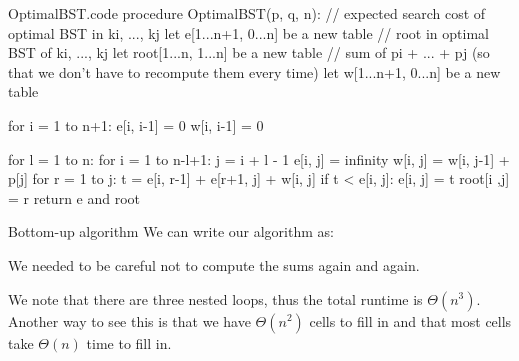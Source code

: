 \documentclass[a4paper]{article}
\begin{document}
\begin{filecontents*}[overwrite]{OptimalBST.code}
procedure OptimalBST(p, q, n):
    // expected search cost of optimal BST in ki, ..., kj
    let e[1...n+1, 0...n] be a new table
    // root in optimal BST of ki, ..., kj
    let root[1...n, 1...n] be a new table
    // sum of pi + ... + pj (so that we don't have to recompute them every time)
    let w[1...n+1, 0...n] be a new table

    for i = 1 to n+1:
        e[i, i-1] = 0
        w[i, i-1] = 0

    for l = 1 to n:
        for i = 1 to n-l+1:
            j = i + l - 1
            e[i, j] = infinity
            w[i, j] = w[i, j-1] + p[j]
            for r = 1 to j:
                t = e[i, r-1] + e[r+1, j] + w[i, j]
                if t < e[i, j]:
                    e[i, j] = t
                    root[i ,j] = r
    return e and root
\end{filecontents*}


\begin{parag}{Bottom-up algorithm}
    We can write our algorithm as:

    We needed to be careful not to compute the sums again and again.

    We note that there are three nested loops, thus the total runtime is $\Theta\left(n^3\right)$. Another way to see this is that we have $\Theta\left(n^2\right)$ cells to fill in and that most cells take $\Theta\left(n\right)$ time to fill in.
\end{parag}
\end{document}

